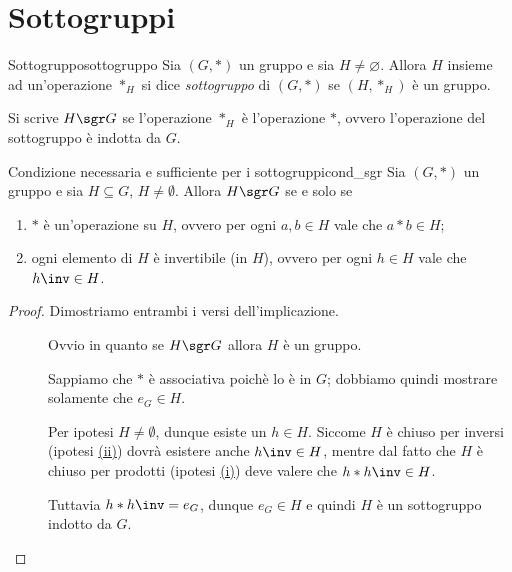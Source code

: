 \section{Sottogruppi}

\begin{definition}{Sottogruppo}{sottogruppo}
    Sia $(G, \ast)$ un gruppo e sia $H \neq \varnothing$.    
    Allora $H$ insieme ad un'operazione $\ast_H$ si dice \emph{sottogruppo} di $(G, \ast)$ se $(H, \ast_H)$ è un gruppo.

    Si scrive $H \sgr G$ se l'operazione $\ast_H$ è l'operazione $\ast$, ovvero l'operazione del sottogruppo è indotta da $G$.
\end{definition}

\begin{proposition}{Condizione necessaria e sufficiente per i sottogruppi}{cond_sgr}
    Sia $(G, \ast)$ un gruppo e sia $H \subseteq G$, $H \neq \emptyset$.
    Allora $H \sgr G$ se e solo se \begin{enumerate}[label={(\roman*)}]
        \item \label{prop:cond_sgr:op} $\ast$ è un'operazione su $H$, ovvero per ogni $a, b \in H$ vale che $a\ast b \in H$;
        \item \label{prop:cond_sgr:inv} ogni elemento di $H$ è invertibile (in $H$), ovvero per ogni $h \in H$ vale che $h\inv \in H$.
    \end{enumerate}
\end{proposition}
\begin{proof}
    Dimostriamo entrambi i versi dell'implicazione.
    \begin{description}
        \item[\boximpl] Ovvio in quanto se $H \sgr G$ allora $H$ è un gruppo.
        \item[\boximplby] Sappiamo che $\ast$ è associativa poichè lo è in $G$; dobbiamo quindi mostrare solamente che $e_G \in H$.
        
        Per ipotesi $H \neq \emptyset$, dunque esiste un $h \in H$. Siccome $H$ è chiuso per inversi (ipotesi \hyperref[prop:cond_sgr:inv]{(ii)}) dovrà esistere anche $h\inv \in H$, mentre dal fatto che $H$ è chiuso per prodotti (ipotesi \hyperref[prop:cond_sgr:op]{(i)}) deve valere che $h \ast h\inv \in H$. 

        Tuttavia $h \ast h\inv = e_G$, dunque $e_G \in H$ e quindi $H$ è un sottogruppo indotto da $G$. \qedhere
    \end{description}
\end{proof}

